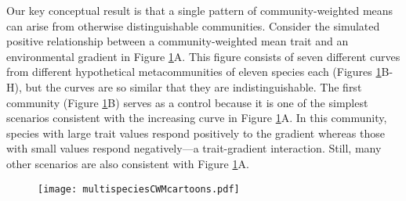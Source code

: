 \documentclass[12pt]{ecology}
\begin{document}
Our key conceptual result is that a single pattern of community-weighted means can arise from otherwise distinguishable communities.  Consider the simulated positive relationship between a community-weighted mean trait and an environmental gradient in Figure \ref{fig:graphicalmodels}A.  This figure consists of seven different curves from different hypothetical metacommunities of eleven species each (Figures \ref{fig:graphicalmodels}B-H), but the curves are so similar that they are indistinguishable.  The first community (Figure \ref{fig:graphicalmodels}B) serves as a control because it is one of the simplest scenarios consistent with the increasing curve in Figure \ref{fig:graphicalmodels}A.  In this community, species with large trait values respond positively to the gradient whereas those with small values respond negatively---a trait-gradient interaction.  Still, many other scenarios are also consistent with Figure \ref{fig:graphicalmodels}A.

\begin{figure}
\caption[The relationships between a community-weighted mean trait and an environmental gradient (A) for seven different metacommunities (B-H).  The lines in (A) are indistinguishable, indicating that information on the differences of the metacommunities is lost by community-weighted averaging.  The lines in B-H correspond to individual species, with trait value indicated by numbers.]{}
\texttt{[image: multispeciesCWMcartoons.pdf]}
\label{fig:graphicalmodels}

\end{figure}
\end{document}

